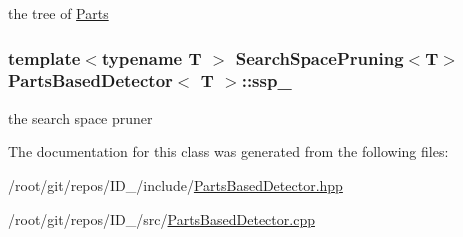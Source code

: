 the tree of \hyperlink{classParts}{\-Parts} 

\hypertarget{classPartsBasedDetector_aae91c693f9d01e3e6cbd552d7f81e474}{
\subsubsection[{ssp\-\_\-}]{\setlength{\rightskip}{0pt plus 5cm}template$<$typename T $>$ {\bf \-Search\-Space\-Pruning}$<$\-T$>$ {\bf \-Parts\-Based\-Detector}$<$ \-T $>$\-::{\bf ssp\-\_\-}}}\label{classPartsBasedDetector_aae91c693f9d01e3e6cbd552d7f81e474}


the search space pruner 



\-The documentation for this class was generated from the following files\-:\begin{DoxyCompactItemize}
\item 
/root/git/repos/\-I\-D\-\_/include/\hyperlink{PartsBasedDetector_8hpp}{\-Parts\-Based\-Detector.\-hpp}\item 
/root/git/repos/\-I\-D\-\_/src/\hyperlink{PartsBasedDetector_8cpp}{\-Parts\-Based\-Detector.\-cpp}\end{DoxyCompactItemize}
